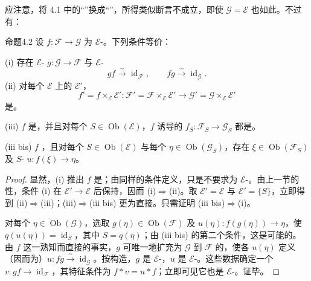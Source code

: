 应注意，将 4.1 中的“”换成“”，所得类似断言不成立，即使 $\mathcal G=\mathcal E$ 也如此。不过有：

\begin{SGAresult}{命题}{4.2}
设 $f:\mathcal F\to\mathcal G$ 为 $\mathcal E$-。下列条件等价：

\textup{(i)} 存在 $\mathcal E$- $g:\mathcal G\to\mathcal F$ 与 $\mathcal E$-
\[
 gf\xrightarrow{\sim}\operatorname{id}_{\mathcal F},\qquad
 fg\xrightarrow{\sim}\operatorname{id}_{\mathcal G}.
\]
\textup{(ii)} 对每个 $\mathcal E$ 上的 $\mathcal E'$，
\[
 f'=f\times_{\mathcal E}\mathcal E':\mathcal F'=\mathcal F\times_{\mathcal E}\mathcal E'
 \longrightarrow\mathcal G'=\mathcal G\times_{\mathcal E}\mathcal E'
\]
是。

\textup{(iii)} $f$ 是，并且对每个 $S\in\operatorname{Ob}(\mathcal E)$，$f$ 诱导的 $f_S:\mathcal F_S\to\mathcal G_S$ 都是。

\textup{(iii bis)} $f$ ，且对每个 $S\in\operatorname{Ob}(\mathcal E)$ 与每个 $\eta\in\operatorname{Ob}(\mathcal G_S)$，存在 $\xi\in\operatorname{Ob}(\mathcal F_S)$ 及 $S$- $u:f(\xi)\to\eta$。
\end{SGAresult}
\begin{proof}
显然，(i) 推出 $f$ 是；由同样的条件定义，只是不要求为 $\mathcal E$-。由上一节的性，条件 (i) 在 $\mathcal E'\to\mathcal E$ 后保持，因而 (i)$\Rightarrow$(ii)。取 $\mathcal E'=\mathcal E$ 与 $\mathcal E'=\{S\}$，立即得到 (ii)$\Rightarrow$(iii)；(iii)$\Rightarrow$(iii bis) 更为直接。只需证明 (iii bis)$\Rightarrow$(i)。

对每个 $\eta\in\operatorname{Ob}(\mathcal G)$，选取 $g(\eta)\in\operatorname{Ob}(\mathcal F)$ 及 $u(\eta):f(g(\eta))\to\eta$，使 $q(u(\eta))=\operatorname{id}_S$，其中 $S=q(\eta)$；由 (iii bis) 的第二个条件，这是可能的。由 $f$ 这一熟知而直接的事实，$g$ 可唯一地扩充为 $\mathcal G$ 到 $\mathcal F$ 的，使各 $u(\eta)$ 定义（因而为）$u:fg\xrightarrow{\sim}\operatorname{id}_{\mathcal G}$。按构造，$g$ 是 $\mathcal E$-，$u$ 是 $\mathcal E$-。这些数据确定一个 $v:gf\to\operatorname{id}_{\mathcal F}$，其特征条件为 $f*v=u*f$；立即可见它也是 $\mathcal E$-。证毕。
\end{proof}

